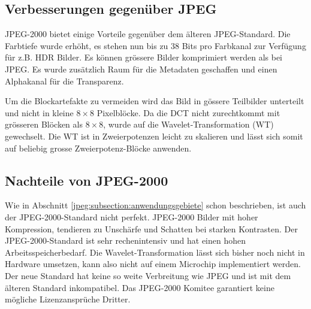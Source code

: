 \subsection{Verbesserungen gegenüber JPEG
\label{jpeg:subsection:verbesserungen}}
JPEG-2000 bietet einige Vorteile gegenüber dem älteren JPEG-Standard.
Die Farbtiefe wurde erhöht, es stehen nun bis zu 38 Bits pro Farbkanal zur Verfügung für z.B. HDR Bilder.
Es können grössere Bilder komprimiert werden als bei JPEG.
Es wurde zusätzlich Raum für die Metadaten geschaffen und einen Alphakanal für die Transparenz.
 
Um die Blockartefakte zu vermeiden wird das Bild in gössere Teilbilder unterteilt und nicht in kleine \(8\times8\) Pixelblöcke.
Da die DCT nicht zurechtkommt mit grösseren Blöcken als \(8\times8\), wurde auf die Wavelet-Transformation (WT) gewechselt.
Die WT ist in Zweierpotenzen leicht zu skalieren und lässt sich somit auf beliebig grosse Zweierpotenz-Blöcke anwenden.

\subsection{Nachteile von JPEG-2000
\label{jpeg:subsection:nachteil}}
Wie in Abschnitt \ref{jpeg:subsection:anwendungsgebiete} schon beschrieben, ist auch der JPEG-2000-Standard nicht perfekt.
JPEG-2000 Bilder mit hoher Kompression, tendieren zu Unschärfe und Schatten bei starken Kontrasten. 
Der JPEG-2000-Standard ist sehr rechenintensiv und hat einen hohen Arbeitsspeicherbedarf. 
Die Wavelet-Transformation lässt sich bisher noch nicht in Hardware umsetzen, kann also nicht auf einem Microchip implementiert werden.
Der neue Standard hat keine so weite Verbreitung wie JPEG und ist mit dem älteren Standard inkompatibel.
Das JPEG-2000 Komitee garantiert keine mögliche Lizenzansprüche Dritter.
